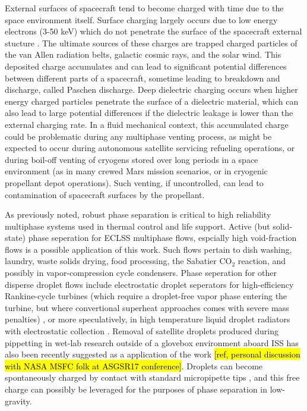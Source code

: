 \documentclass[10pt,a4paper]{article}
\begin{document}
External surfaces of spacecraft tend to become charged with time due to the space environment itself. Surface charging largely occurs due to low energy electrons (3-50 keV) which do not penetrate the surface of the spacecraft external stucture \cite{czepiela_charging_1997}. The ultimate sources of these charges are trapped charged particles of the van Allen radiation belts, galactic cosmic rays, and the solar wind. This deposited charge accumulates and can lead to significant potential differences between different parts of a spacecraft, sometime leading to breakdown and discharge, called Paschen discharge. Deep dielectric charging occurs when higher energy charged particles penetrate the surface of a dielectric material, which can also lead to large potential differences if the dielectric leakage is lower than the external charging rate. In a fluid mechanical context, this accumulated charge could be problematic during any multiphase venting process, as might be expected to occur during autonomous satellite servicing refueling operations, or during boil-off venting of cryogens stored over long periods in a space environment (as in many crewed Mars mission scenarios, or in cryogenic propellant depot operations). Such venting, if uncontrolled, can lead to contamination of spacecraft surfaces by the propellant.

As previously noted, robust phase separation is critical to high reliability multiphase systems used in thermal control and life support. Active (but solid-state) phase seperation for ECLSS multiphase flows, espcially high void-fraction flows is a possible application of this work. Such flows pertain to dish washing, laundry, waste solids drying, food processing, the Sabatier CO$_2$ reaction, and possibly in vapor-compression cycle condensers. Phase seperation for other disperse droplet flows include electrostatic droplet seperators for high-efficiency Rankine-cycle turbines (which require a droplet-free vapor phase entering the turbine, but where convertional superheat approaches comes with severe mass penalties) \cite{unterberg_zero_1962}, or more speculatively, in high temperature liquid droplet radiators with electrostatic collection \cite{white_liquid_1987}. Removal of satellite droplets produced during pippetting in wet-lab research outside of a glovebox environment aboard ISS has also been recently suggested as a application of the work \hl{[ref, personal discussion with NASA MSFC folk at ASGSR17 conference]}. Droplets can become spontaneously charged by contact with standard micropipette tips \cite{choi_spontaneous_2013}, and this free charge can possibly be leveraged for the purposes of phase separation in low-gravity. 
\end{document}
